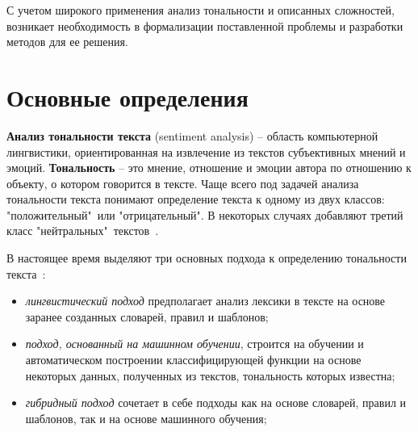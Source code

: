С учетом широкого применения анализ тональности и описанных сложностей,
возникает необходимость в формализации поставленной проблемы и разработки
методов для ее решения.

\section{Основные определения}

\textbf{Анализ тональности текста} (sentiment analysis) -- область компьютерной
лингвистики, ориентированная на извлечение из текстов субъективных мнений и
эмоций. \textbf{Тональность} -- это мнение, отношение и эмоции автора по
отношению к объекту, о котором говорится в тексте.  Чаще всего под задачей
анализа тональности текста понимают определение текста к одному из двух классов:
"положительный"\ или "отрицательный". В некоторых случаях добавляют третий класс
"нейтральных"\ текстов~\cite{article05}.

В настоящее время выделяют три основных подхода к определению тональности
текста~\cite{article05}:
\begin{itemize}
    \item \textit{лингвистический подход} предполагает анализ лексики в тексте на
        основе заранее созданных словарей, правил и шаблонов;

    \item \textit{подход, основанный на машинном обучении}, строится на обучении и
        автоматическом построении классифицирующей функции на основе
        некоторых данных, полученных из текстов, тональность которых
        известна;

    \item \textit{гибридный подход} сочетает в себе подходы как на основе
        словарей, правил и шаблонов, так и на основе машинного обучения;
\end{itemize}

